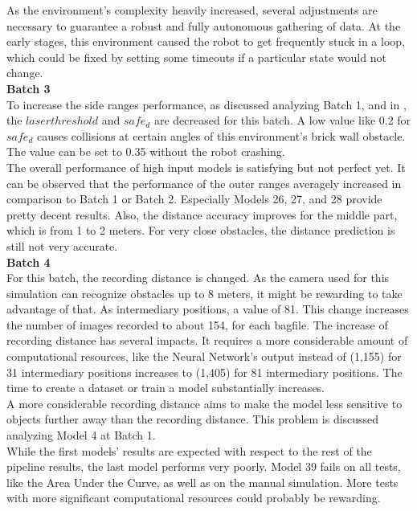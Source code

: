 As the environment's complexity heavily increased, several adjustments are necessary to guarantee a robust and fully autonomous gathering of data. At the early stages, this environment caused the robot to get frequently stuck in a loop, which could be fixed by setting some timeouts if a particular state would not change.\\

\textbf{Batch 3}\\
To increase the side ranges performance, as discussed analyzing Batch 1, and in , the $laser threshold$ and  $safe_{d}$ are decreased for this batch. A low value like 0.2 for $safe_{d}$ causes collisions at certain angles of this environment's brick wall obstacle. The value can be set to 0.35 without the robot crashing.\\

The overall performance of high input models is satisfying but not perfect yet. It can be observed that the performance of the outer ranges averagely increased in comparison to Batch 1 or Batch 2. Especially Models 26, 27, and 28 provide pretty decent results. Also, the distance accuracy improves for the middle part, which is from 1 to 2 meters. For very close obstacles, the distance prediction is still not very accurate.\\

\textbf{Batch 4}\\
For this batch, the recording distance is changed. As the camera used for this simulation can recognize obstacles up to 8 meters, it might be rewarding to take advantage of that. As intermediary positions, a value of 81. This change increases the number of images recorded to about 154, for each bagfile. The increase of recording distance has several impacts. It requires a more considerable amount of computational resources, like the Neural Network's output instead of (1,155) for 31 intermediary positions increases to (1,405) for 81 intermediary positions. The time to create a dataset or train a model substantially increases.\\

A more considerable recording distance aims to make the model less sensitive to objects further away than the recording distance. This problem is discussed analyzing Model 4 at Batch 1.\\

While the first models' results are expected with respect to the rest of the pipeline results, the last model performs very poorly. Model 39 fails on all tests, like the Area Under the Curve, as well as on the manual simulation. More tests with more significant computational resources could probably be rewarding.\\


